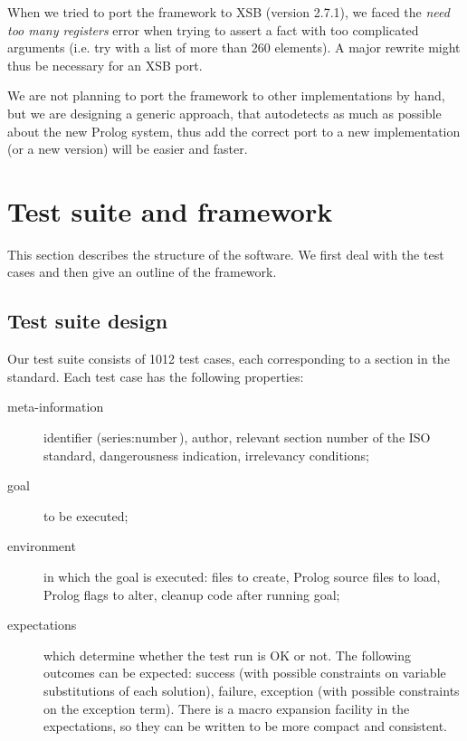 \documentclass[draft]{llncs}%
\begin{document}
When we tried to port the framework to XSB (version 2.7.1), we faced the
\emph{need too many registers} error when trying to assert a fact with too
complicated arguments (i.e. try
with a list of more than 260 elements). A major rewrite might
thus be necessary for an XSB port.

We are not planning to port the framework to other implementations by hand,
but we are designing a generic approach, that autodetects as much as possible
about the new Prolog system, thus add the correct port to a new
implementation (or a new version) will be easier and faster.

\section{Test suite and framework}

This section describes the structure of the software. We first deal with the
test cases and then give an outline of the framework.

\subsection{Test suite design}\label{suite}

Our test suite consists of 1012 test cases, each corresponding to a
section in the standard. Each test
case has the following properties:
%
\begin{description}

\item[meta-information]
identifier ($\textrm{series}:\textrm{number}$), author, relevant
section number of the ISO standard, dangerousness indication, irrelevancy
conditions;

\item[goal]
to be executed;

\item[environment]
in which the goal is executed: files to create, Prolog source files to load,
Prolog flags to alter, cleanup code after running goal;

\item[expectations]
which determine whether the test run is OK or not. The following outcomes can
be expected: success (with possible constraints on variable substitutions of
each solution), failure, exception (with possible constraints on the
exception term). There is a macro expansion facility in the expectations, so
they can be written to be more compact and consistent.

\end{description}
\end{document}
